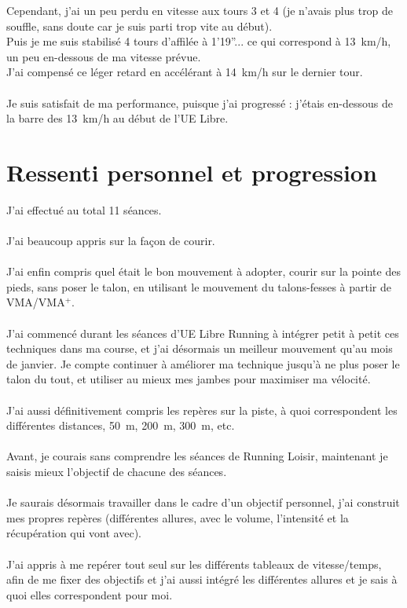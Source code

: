 \documentclass{article}
\begin{document}
            Cependant, j'ai un peu perdu en vitesse aux tours 3 et 4 (je n'avais plus trop de souffle, sans doute car je suis parti trop vite au début).\\
            Puis je me suis stabilisé 4 tours d'affilée à 1'19''... ce qui correspond à 13 km/h, un peu en-dessous de ma vitesse prévue.\\
            J'ai compensé ce léger retard en accélérant à 14 km/h sur le dernier tour.\\\\
            Je suis satisfait de ma performance, puisque j'ai progressé : j'étais en-dessous de la barre des 13 km/h au début de l'UE Libre.
\section{Ressenti personnel et progression}
    J'ai effectué au total 11 séances.\\\\
    J'ai beaucoup appris sur la façon de courir.\\\\
    J'ai enfin compris quel était le bon mouvement à adopter, courir sur la pointe des pieds, sans poser le talon, en utilisant le mouvement du talons-fesses à partir de VMA/VMA$^+$.\\\\
    J'ai commencé durant les séances d'UE Libre Running à intégrer petit à petit ces techniques dans ma course, et j'ai désormais un meilleur mouvement qu'au mois de janvier. Je compte continuer à améliorer ma technique jusqu'à ne plus poser le talon du tout, et utiliser au mieux mes jambes pour maximiser ma vélocité.\\\\
    J'ai aussi définitivement compris les repères sur la piste, à quoi correspondent les différentes distances, 50 m, 200 m, 300 m, etc.\\\\
    Avant, je courais sans comprendre les séances de Running Loisir, maintenant je saisis mieux l'objectif de chacune des séances.\\\\
    Je saurais désormais travailler dans le cadre d'un objectif personnel, j'ai construit mes propres repères (différentes allures, avec le volume, l'intensité et la récupération qui vont avec).\\\\
    J'ai appris à me repérer tout seul sur les différents tableaux de vitesse/temps, afin de me fixer des objectifs et j'ai aussi intégré les différentes allures et je sais à quoi elles correspondent pour moi.\\\\
\end{document}
